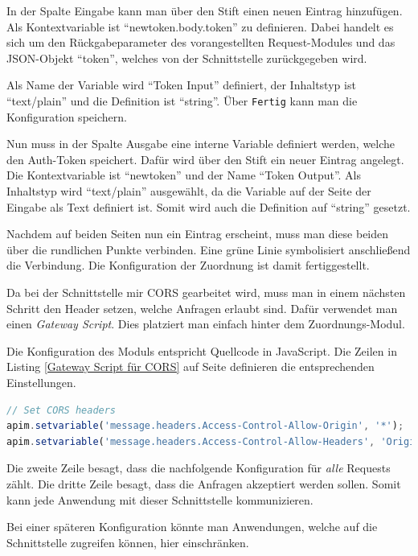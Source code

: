 In der Spalte Eingabe kann man über den Stift einen neuen Eintrag hinzufügen. Als Kontextvariable ist
\enquote{newtoken.body.token} zu definieren. Dabei handelt es sich um den Rückgabeparameter des vorangestellten
Request-Modules und das JSON-Objekt \enquote{token}, welches von der Schnittstelle zurückgegeben wird.

Als Name der Variable wird \enquote{Token Input} definiert, der Inhaltstyp ist \enquote{text/plain} und die Definition
ist \enquote{string}. Über \texttt{Fertig} kann man die Konfiguration speichern.

Nun muss in der Spalte Ausgabe eine interne Variable definiert werden, welche den Auth-Token speichert. Dafür wird über
den Stift ein neuer Eintrag angelegt. Die Kontextvariable ist \enquote{newtoken} und der Name \enquote{Token Output}.
Als Inhaltstyp wird \enquote{text/plain} ausgewählt, da die Variable auf der Seite der Eingabe als Text definiert ist.
Somit wird auch die Definition auf \enquote{string} gesetzt.

Nachdem auf beiden Seiten nun ein Eintrag erscheint, muss man diese beiden über die rundlichen Punkte verbinden. Eine
grüne Linie symbolisiert anschließend die Verbindung. Die Konfiguration der Zuordnung ist damit fertiggestellt.

Da bei der Schnittstelle mir CORS gearbeitet wird, muss man in einem nächsten Schritt den Header setzen, welche Anfragen
erlaubt sind. Dafür verwendet man einen \textit{Gateway Script}. Dies platziert man einfach hinter dem Zuordnungs-Modul.

Die Konfiguration des Moduls entspricht Quellcode in JavaScript. Die Zeilen in Listing \ref{Gateway Script für CORS} auf
Seite \pageref{Gateway Script für CORS} definieren die entsprechenden Einstellungen.

\begin{lstlisting}[language=JavaScript, caption=Gateway Script für CORS, label=Gateway Script für CORS]
// Set CORS headers
apim.setvariable('message.headers.Access-Control-Allow-Origin', '*');
apim.setvariable('message.headers.Access-Control-Allow-Headers', 'Origin, X-Requested-With, Content-Type, Accept');
\end{lstlisting}

Die zweite Zeile besagt, dass die nachfolgende Konfiguration für \textit{alle} Requests zählt. Die dritte Zeile besagt,
dass die Anfragen akzeptiert werden sollen. Somit kann jede Anwendung mit dieser Schnittstelle kommunizieren.

Bei einer späteren Konfiguration könnte man Anwendungen, welche auf die Schnittstelle zugreifen können, hier einschränken.

